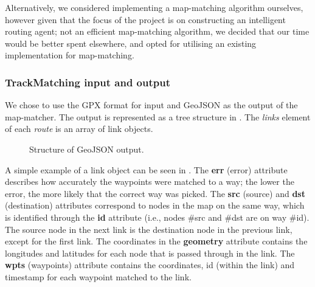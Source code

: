 Alternatively, we considered implementing a map-matching algorithm ourselves, however given that the focus of the project is on constructing an intelligent routing agent; not an efficient map-matching algorithm, we decided that our time would be better spent elsewhere, and opted for utilising an existing implementation for map-matching.

\subsubsection{TrackMatching input and output}
We chose to use the GPX format for input and GeoJSON as the output of the map-matcher. The output is represented as a tree structure in . The \emph{links} element of each \emph{route} is an array of link objects.

\begin{figure}[H]
	\centering
	\caption{Structure of GeoJSON output.}
	\label{fig:geojson}
\end{figure}

A simple example of a link object can be seen in . The \textbf{err} (error) attribute describes how accurately the waypoints were matched to a way; the lower the error, the more likely that the correct way was picked. The \textbf{src} (source) and \textbf{dst} (destination) attributes correspond to nodes in the map on the same way, which is identified through the \textbf{id} attribute (i.e., nodes \#src and \#dst are on way \#id). The source node in the next link is the destination node in the previous link, except for the first link. The coordinates in the \textbf{geometry} attribute contains the longitudes and latitudes for each node that is passed through in the link. The \textbf{wpts} (waypoints) attribute contains the coordinates, id (within the link) and timestamp for each waypoint matched to the link.

